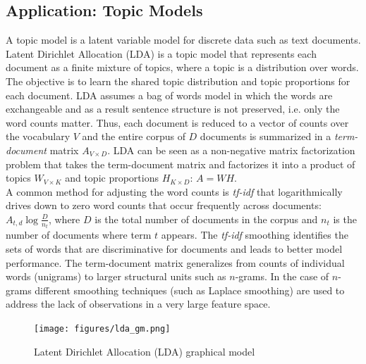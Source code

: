 \subsection{Application: Topic Models}

A topic model is a latent variable model for discrete data such as text documents. Latent Dirichlet Allocation (LDA) is a topic model that represents each document as a finite mixture of topics, where a topic is a distribution over words. The objective is to learn the shared topic distribution and topic proportions for each document. LDA assumes a bag of words model in which the words are exchangeable and as a result sentence structure is not preserved, i.e. only the word counts matter. Thus, each document is reduced to a vector of counts over the vocabulary $V$ and the entire corpus of $D$ documents is summarized in a \textit{term-document} matrix $A_{V\times D}$. LDA can be seen as a non-negative matrix factorization problem that takes the term-document matrix and factorizes it into a product of topics $W_{V\times K}$ and topic proportions $H_{K\times D}$: $A = WH$.\\

A common method for adjusting the word counts is \textit{tf-idf} that logarithmically drives down to zero word counts that occur frequently across documents: $A_{t,d} \log \frac{D}{n_t}$, where $D$ is the total number of documents in the corpus and $n_t$ is the number of documents where term $t$ appears. The \textit{tf-idf} smoothing identifies the sets of words that are discriminative for documents and leads to better model performance. The term-document matrix generalizes from counts of individual words (unigrams) to larger structural units such as $n$-grams. In the case of $n$-grams different smoothing techniques (such as Laplace smoothing) are used to address the lack of observations in a very large feature space.\\ 

\begin{figure}[tbhp]
    \centering
    \texttt{[image: figures/lda\_gm.png]}
    \caption{Latent Dirichlet Allocation (LDA) graphical model}
    \label{fig:lda_gm}
\end{figure}

